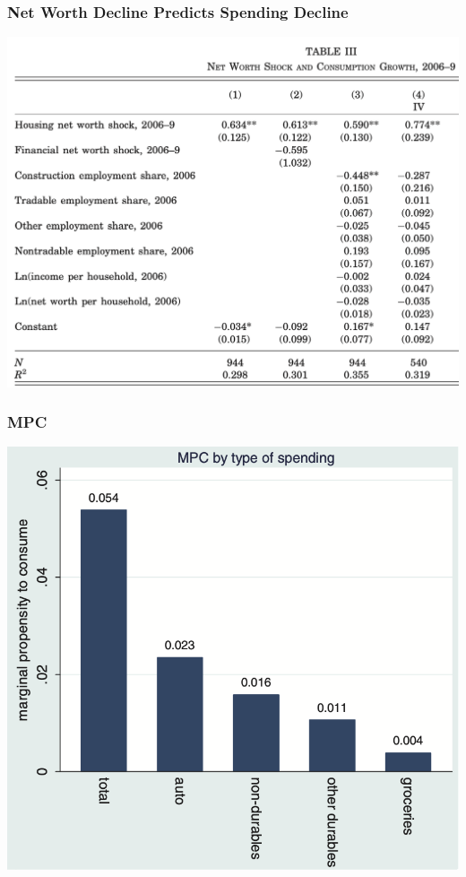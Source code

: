 \documentclass[english,xcolor=svgnames]{beamer}
\begin{document}
\begin{frame}
\frametitle[alignment=center]{Net Worth Decline Predicts Spending Decline}
\centering
\includegraphics[scale=0.5]{figures/MRSTAB3.png}
\end{frame}

\begin{frame}
\frametitle[alignment=center]{MPC}
\centering
\includegraphics[scale=0.6]{figures/MRSFIG4b.png}
\end{frame}
\end{document}
